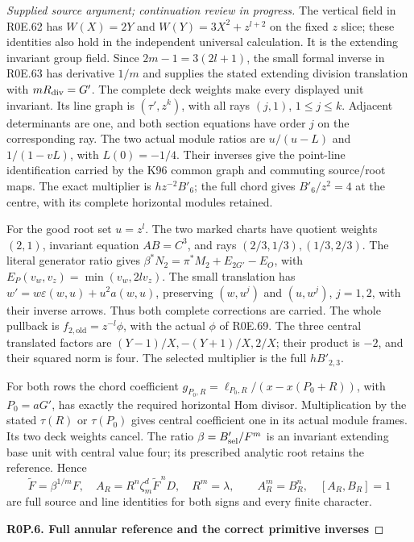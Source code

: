 \begin{proof}[Supplied source argument; continuation review in progress]
The vertical field in R0E.62 has
\(W(X)=2Y\) and \(W(Y)=3X^2+z^{l+2}\) on the fixed
\(z\) slice; these identities also hold in the independent
universal calculation. It is the extending invariant group
field. Since \(2m-1=3(2l+1)\), the small formal inverse
in R0E.63 has derivative \(1/m\) and supplies the stated
extending division translation with \(mR_{\rm div}=G'\).
The complete deck weights make every displayed unit
invariant. Its line graph is \((\tau',z^k)\), with all
rays \((j,1)\), \(1\le j\le k\). Adjacent determinants
are one, and both section equations have order \(j\) on
the corresponding ray. The two actual module ratios are
\(u/(u-L)\) and \(1/(1-vL)\), with \(L(0)=-1/4\).
Their inverses give the point-line identification carried by
the K96 common graph and commuting source/root maps.
The exact multiplier is \(h z^{-2}B'_6\); the full chord
gives \(B'_6/z^2=4\) at the centre, with its complete
horizontal modules retained.

For the good root set \(u=z^l\). The two marked charts
have quotient weights \((2,1)\), invariant equation
\(AB=C^3\), and rays \((2/3,1/3),(1/3,2/3)\).
The literal generator ratio gives
\(\beta^*N_2=\pi^*M_2+E_{2G'}-E_O\), with
\(E_P(v_w,v_z)=\min(v_w,2lv_z)\). The small translation
has \(w'=w\varepsilon(w,u)+u^2a(w,u)\), preserving
\((w,u^j)\) and \((u,w^j)\), \(j=1,2\), with their
inverse arrows. Thus both complete corrections are carried.
The whole pullback is
\(f_{2,\mathrm{old}}=z^{-l}\phi\), with the actual
\(\phi\) of R0E.69. The three central translated factors
are \((Y-1)/X,-(Y+1)/X,2/X\); their product is \(-2\),
and their squared norm is four. The selected multiplier
is the full \(hB'_{2,3}\).

For both rows the chord coefficient
\(g_{P_0,R}=\ell_{P_0,R}/(x-x(P_0+R))\), with
\(P_0=aG'\), has exactly the required horizontal Hom
divisor. Multiplication by the stated \(\tau(R)\) or
\(\tau(P_0)\) gives central coefficient one in its
actual module frames. Its two deck weights cancel. The
ratio \(\beta=B'_{\rm sel}/F^m\) is an invariant
extending base unit with central value four; its prescribed
analytic root retains the reference. Hence
\[
 \widetilde F=\beta^{1/m}F,\quad
 A_R=R^n\zeta_m^d\widetilde F^{\,n}D,\quad R^m=\lambda,
 \qquad A_R^m=B_R^n,\quad [A_R,B_R]=1
 \tag{R0P.17}
\]
are full source and line identities for both signs and every
finite character.

\par

\medskip\noindent\textbf{R0P.6. Full annular reference and the correct primitive inverses}


\end{proof}
